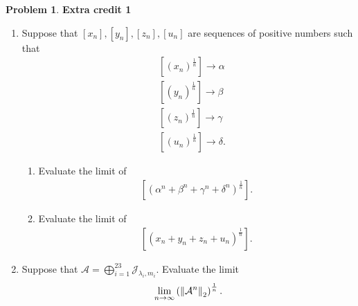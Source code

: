 \documentclass{book}
\theoremstyle{definition}
\newtheorem*{prob*}{Problem}
\newcommand{\A}{\mathcal{A}}
\newcommand{\jor}{\mathcal{J}}
\begin{document}
\newpage




\begin{prob*}\textbf{Extra credit 1}\\
	\begin{enumerate}
		\item Suppose that $[x_n],[y_n],[z_n],[u_n]$ are sequences of positive numbers such that
		\begin{align*}
		& \left[ (x_n)^{\frac{1}{n}} \right] \longrightarrow \alpha\\
		& \left[ (y_n)^{\frac{1}{n}} \right] \longrightarrow \beta\\
		& \left[ (z_n)^{\frac{1}{n}} \right] \longrightarrow \gamma\\
		& \left[ (u_n)^{\frac{1}{n}} \right] \longrightarrow \delta.
		\end{align*}
		
		
		\begin{enumerate}
			\item Evaluate the limit of 
			\begin{align*}
			\left[ (\alpha^n + \beta^n + \gamma^n + \delta^n)^{\frac{1}{n}} \right].
			\end{align*} 
			
			
			\item Evaluate the limit of 
			\begin{align*}
			\left[ (x_n + y_n + z_n + u_n)^{\frac{1}{n}} \right].
			\end{align*}
		\end{enumerate}
	
	
	\item Suppose that $\A = \bigoplus^{23}_{i=1} \jor_{\lambda_i, m_i}$. Evaluate the limit
	\begin{align*}
	\lim\limits_{n\to\infty}\left( \norm{\A^n}_2 \right)^{\frac{1}{n}}.
	\end{align*}
	\end{enumerate}
	
	
	

\end{prob*}
\end{document}
